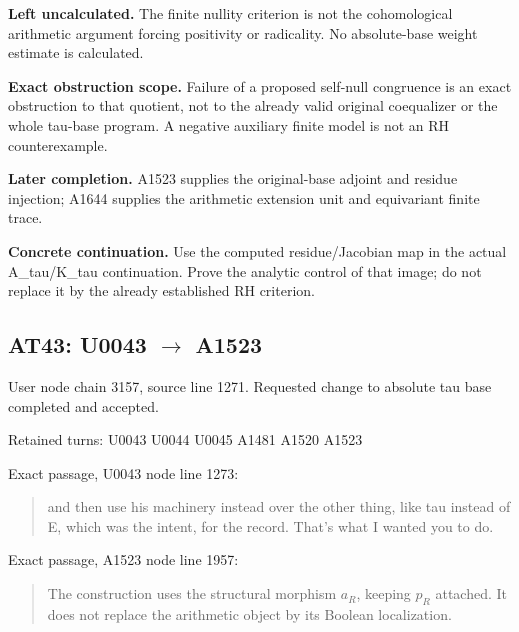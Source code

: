 \textbf{Left uncalculated.} The finite nullity criterion is not the
cohomological arithmetic argument forcing positivity or radicality. No
absolute-base weight estimate is calculated.

\textbf{Exact obstruction scope.} Failure of a proposed self-null
congruence is an exact obstruction to that quotient, not to the already
valid original coequalizer or the whole tau-base program. A negative
auxiliary finite model is not an RH counterexample.

\textbf{Later completion.} A1523 supplies the original-base adjoint and
residue injection; A1644 supplies the arithmetic extension unit and
equivariant finite trace.

\textbf{Concrete continuation.} Use the computed residue/Jacobian map in
the actual A\_tau/K\_tau continuation. Prove the analytic control of
that image; do not replace it by the already established RH criterion.

\subsection{\texorpdfstring{AT43: U0043
\allowbreak{}\ensuremath{→}\allowbreak{}
A1523}{AT43: U0043  A1523}}\label{TranscriptLedgerStage:at43-u0043-a1523}

User node \protect{} chain
3157, source line 1271. Requested change to absolute tau base completed
and accepted.

Retained turns: U0043
\protect{} U0044
\protect{} U0045
\protect{} A1481
\protect{} A1520
\protect{} A1523
\protect{}

Exact passage, U0043 node
\protect{} line 1273:

\begin{quote}
and then use his machinery instead over the other thing, like tau
instead of E, which was the intent, for the record. That's what I wanted
you to do.
\end{quote}

Exact passage, A1523 node
\protect{} line 1957:

\begin{quote}
The construction uses the structural morphism \(a_R\), keeping \(p_R\)
attached. It does not replace the arithmetic object by its Boolean
localization.
\end{quote}

